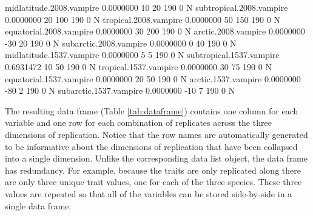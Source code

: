 \documentclass[a4paper]{report}
\numberwithin{exercise}{section}
\begin{document}
\begin{article}
\begin{table*}
\begin{Schunk}
\begin{Soutput}
midlatitude.2008.vampire  0.0000000          10            20       190              0          N
subtropical.2008.vampire  0.0000000          20           100       190              0          N
tropical.2008.vampire     0.0000000          50           150       190              0          N
equatorial.2008.vampire   0.0000000          30           200       190              0          N
arctic.2008.vampire       0.0000000         -30            20       190              0          N
subarctic.2008.vampire    0.0000000           0            40       190              0          N
midlatitude.1537.vampire  0.0000000           5             5       190              0          N
subtropical.1537.vampire  0.6931472          10            50       190              0          N
tropical.1537.vampire     0.0000000          30            75       190              0          N
equatorial.1537.vampire   0.0000000          20            50       190              0          N
arctic.1537.vampire       0.0000000         -80             2       190              0          N
subarctic.1537.vampire    0.0000000         -10             7       190              0          N
\end{Soutput}
\end{Schunk}
\end{table*}



The resulting data frame (Table \ref{tab:dataframe}) contains one column for each variable and one row for each combination of replicates across the three dimensions of replication.  Notice that the row names are automatically generated to be informative about the dimensions of replication that have been collapsed into a single dimension.  Unlike the corresponding data list object, the data frame has redundancy.  For example, because the traits are only replicated along  there are only three unique trait values, one for each of the three species.  These three values are repeated so that all of the variables can be stored side-by-side in a single data frame.


\end{article}
\end{document}
